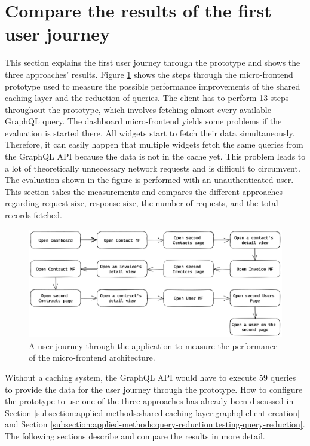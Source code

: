 \section{Compare the results of the first user journey}\label{section:results:comparison-first-journey}

This section explains the first user journey through the prototype and shows the three approaches' results. Figure \ref{fig:results:evaluation-first-path} shows the steps through the micro-frontend prototype used to measure the possible performance improvements of the shared caching layer and the reduction of queries. The client has to perform 13 steps throughout the prototype, which involves fetching almost every available GraphQL query. The dashboard micro-frontend yields some problems if the evaluation is started there. All widgets start to fetch their data simultaneously. Therefore, it can easily happen that multiple widgets fetch the same queries from the GraphQL \ac{API} because the data is not in the cache yet. This problem leads to a lot of theoretically unnecessary network requests and is difficult to circumvent. The evaluation shown in the figure is performed with an unauthenticated user. This section takes the measurements and compares the different approaches regarding request size, response size, the number of requests, and the total records fetched.

\ifshowImages
\begin{figure}[H]
  \centering
  \includegraphics[width=1\linewidth]{images/results/evaluation-first-path.png}
  \caption{A user journey through the application to measure the performance of the micro-frontend architecture.}\label{fig:results:evaluation-first-path}
\end{figure}
\fi

\noindent Without a caching system, the GraphQL \ac{API} would have to execute 59 queries to provide the data for the user journey through the prototype. How to configure the prototype to use one of the three approaches has already been discussed in Section \ref{subsection:applied-methods:shared-caching-layer:graphql-client-creation} and Section \ref{subsection:applied-methods:query-reduction:testing-query-reduction}. The following sections describe and compare the results in more detail.

